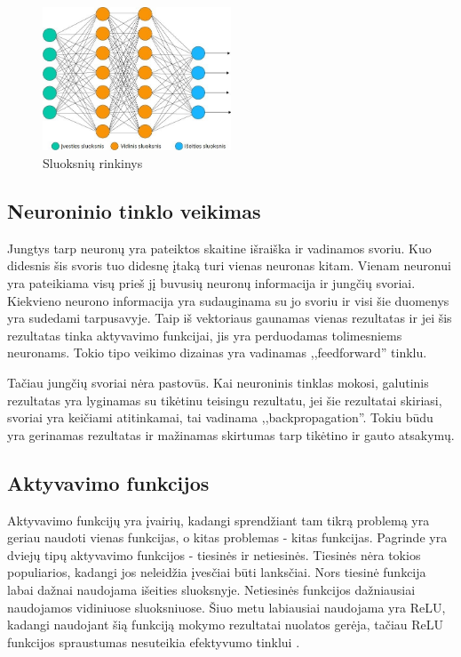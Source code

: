 \documentclass{VUMIFPSkursinis}
\begin{document}
\begin{figure}[h]
\centering
\includegraphics[width=0.5\textwidth]{img/NTSluoksniuSistema.jpeg}
\caption{Sluoksnių rinkinys}
\end{figure}

\subsection{Neuroninio tinklo veikimas}
Jungtys tarp neuronų yra pateiktos skaitine išraiška ir vadinamos svoriu. Kuo didesnis šis svoris tuo didesnę įtaką turi vienas neuronas kitam.
Vienam neuronui yra pateikiama visų prieš jį buvusių neuronų informacija ir jungčių svoriai. Kiekvieno neurono informacija yra sudauginama su
jo svoriu ir visi šie duomenys yra sudedami tarpusavyje. Taip iš vektoriaus gaunamas vienas rezultatas ir jei šis rezultatas tinka aktyvavimo
funkcijai, jis yra perduodamas tolimesniems neuronams. Tokio tipo veikimo dizainas yra vadinamas ,,feedforward'' tinklu.

Tačiau jungčių svoriai nėra pastovūs. Kai neuroninis tinklas mokosi, galutinis rezultatas yra lyginamas su tikėtinu teisingu rezultatu, jei šie
rezultatai skiriasi, svoriai yra keičiami atitinkamai, tai vadinama ,,backpropagation''. Tokiu būdu yra gerinamas rezultatas ir mažinamas skirtumas
tarp tikėtino ir gauto atsakymų.

\subsection{Aktyvavimo funkcijos}
Aktyvavimo funkcijų yra įvairių, kadangi sprendžiant tam tikrą problemą yra geriau naudoti vienas funkcijas, o kitas problemas - kitas funkcijas.
Pagrinde yra dviejų tipų aktyvavimo funkcijos - tiesinės ir netiesinės. Tiesinės nėra tokios populiarios, kadangi jos neleidžia įvesčiai
būti lanksčiai. Nors tiesinė funkcija labai dažnai naudojama išeities sluoksnyje.
Netiesinės funkcijos dažniausiai naudojamos vidiniuose sluoksniuose. Šiuo metu labiausiai naudojama yra ReLU, kadangi naudojant šią funkciją mokymo
rezultatai nuolatos gerėja, tačiau ReLU funkcijos spraustumas nesuteikia efektyvumo tinklui \cite{DBLP:journals/corr/XuWCL15}.
\end{document}
